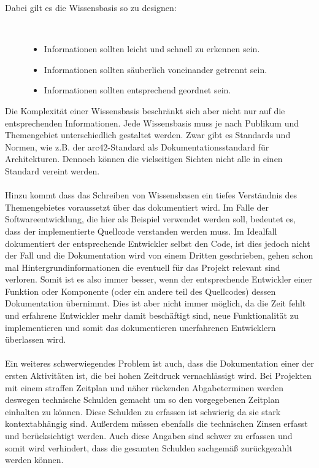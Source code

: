 \documentclass[a4paper,12pt]{scrartcl}
\begin{document}
\begin{description}
   \item[Dabei gilt es die Wissensbasis so zu designen:]~\par
   \begin{itemize}
      \item Informationen sollten leicht und schnell zu erkennen sein.
      \item Informationen sollten säuberlich voneinander getrennt sein. 
      \item Informationen sollten entsprechend geordnet sein.
   \end{itemize}
\end{description}
Die Komplexität einer Wissensbasis beschränkt sich aber nicht nur auf die entsprechenden Informationen. Jede Wissensbasis muss je nach Publikum und Themengebiet unterschiedlich gestaltet werden. Zwar gibt es Standards und Normen, wie z.B. der arc42-Standard als Dokumentationsstandard für Architekturen. Dennoch können die vielseitigen Sichten nicht alle in einen Standard vereint werden.
\\\\
Hinzu kommt dass das Schreiben von Wissensbasen ein tiefes Verständnis des Themengebietes voraussetzt über das dokumentiert wird. Im Falle der Softwareentwicklung, die hier als Beispiel verwendet werden soll, bedeutet es, dass der implementierte Quellcode verstanden werden muss. Im Idealfall dokumentiert der entsprechende Entwickler selbst den Code, ist dies jedoch nicht der Fall und die Dokumentation wird von einem Dritten geschrieben, gehen schon mal Hintergrundinformationen die eventuell für das Projekt relevant sind verloren. Somit ist es also immer besser, wenn der entsprechende Entwickler einer Funktion oder Komponente (oder ein andere teil des Quellcodes) dessen Dokumentation übernimmt. Dies ist aber nicht immer möglich, da die Zeit fehlt und erfahrene Entwickler mehr damit beschäftigt sind, neue Funktionalität zu implementieren und somit das dokumentieren unerfahrenen Entwicklern überlassen wird. 
\\\\ 
Ein weiteres schwerwiegendes Problem ist auch, dass die Dokumentation einer der ersten Aktivitäten ist, die bei hohen Zeitdruck vernachlässigt wird. Bei Projekten mit einem straffen Zeitplan und näher rückenden Abgabeterminen werden deswegen technische Schulden gemacht um so den vorgegebenen Zeitplan einhalten zu können. Diese Schulden zu erfassen ist schwierig da sie stark kontextabhängig sind. Außerdem müssen ebenfalls die technischen Zinsen erfasst und berücksichtigt werden. Auch diese Angaben sind schwer zu erfassen und somit wird verhindert, dass die gesamten Schulden sachgemäß zurückgezahlt werden können.
\end{document}
